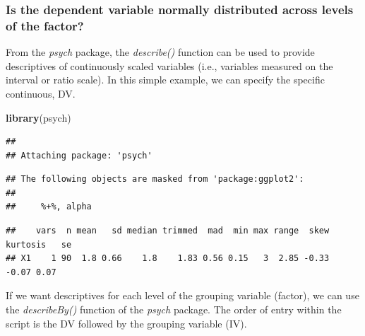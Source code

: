 \documentclass[
  english,
]{book}
\newenvironment{Shaded}{\begin{snugshade}}{\end{snugshade}}
\newcommand{\CommentTok}[1]{\textcolor[rgb]{0.56,0.35,0.01}{\textit{#1}}}
\newcommand{\KeywordTok}[1]{\textcolor[rgb]{0.13,0.29,0.53}{\textbf{#1}}}
\newcommand{\NormalTok}[1]{#1}
\newcommand{\OperatorTok}[1]{\textcolor[rgb]{0.81,0.36,0.00}{\textbf{#1}}}
\begin{document}
\hypertarget{is-the-dependent-variable-normally-distributed-across-levels-of-the-factor}{%
\subsubsection{Is the dependent variable normally distributed across levels of the factor?}\label{is-the-dependent-variable-normally-distributed-across-levels-of-the-factor}}

From the \emph{psych} package, the \emph{describe()} function can be used to provide descriptives of continuously scaled variables (i.e., variables measured on the interval or ratio scale). In this simple example, we can specify the specific continuous, DV.

\begin{Shaded}
\begin{Highlighting}[]
\KeywordTok{library}\NormalTok{(psych)}
\end{Highlighting}
\end{Shaded}

\begin{verbatim}
## 
## Attaching package: 'psych'
\end{verbatim}

\begin{verbatim}
## The following objects are masked from 'package:ggplot2':
## 
##     %+%, alpha
\end{verbatim}

\begin{Shaded}
\end{Shaded}

\begin{verbatim}
##    vars  n mean   sd median trimmed  mad  min max range  skew kurtosis   se
## X1    1 90  1.8 0.66    1.8    1.83 0.56 0.15   3  2.85 -0.33    -0.07 0.07
\end{verbatim}

If we want descriptives for each level of the grouping variable (factor), we can use the \emph{describeBy()} function of the \emph{psych} package. The order of entry within the script is the DV followed by the grouping variable (IV).
\end{document}
